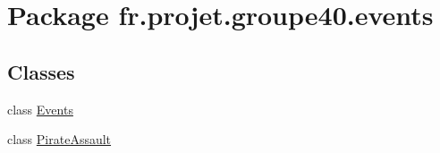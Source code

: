 \hypertarget{namespacefr_1_1projet_1_1groupe40_1_1events}{}\section{Package fr.\+projet.\+groupe40.\+events}
\label{namespacefr_1_1projet_1_1groupe40_1_1events}
\subsection*{Classes}
\begin{DoxyCompactItemize}
\item 
class \hyperlink{classfr_1_1projet_1_1groupe40_1_1events_1_1_events}{Events}
\item 
class \hyperlink{classfr_1_1projet_1_1groupe40_1_1events_1_1_pirate_assault}{Pirate\+Assault}
\end{DoxyCompactItemize}
